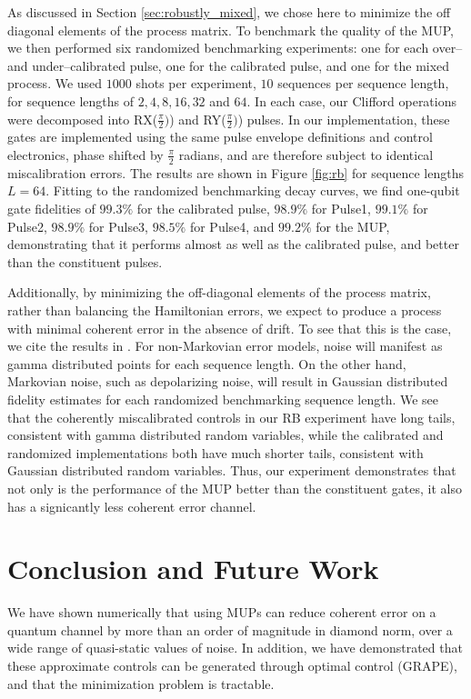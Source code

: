 \documentclass[aps,nofootinbib,pra,notitlepage,twocolumn]{revtex4-1}
\begin{document}
As discussed in Section \ref{sec:robustly_mixed}, we chose here to minimize the off diagonal elements of the process matrix. To benchmark the quality of the MUP, we then performed six randomized benchmarking experiments\cite{Magesan2011}: one for each over-- and under--calibrated pulse, one for the calibrated pulse, and one for the mixed process. We used $1000$ shots per experiment, $10$ sequences per sequence length, for sequence lengths of $2, 4, 8, 16, 32$ and $64$. In each case, our Clifford operations were decomposed into RX($\frac{\pi}{2})$) and RY($\frac{\pi}{2})$) pulses. In our implementation, these gates are implemented using the same pulse envelope definitions and control electronics, phase shifted by $\frac{\pi}{2}$ radians, and are therefore subject to identical miscalibration errors. The results are shown in Figure \ref{fig:rb} for sequence lengths $L=64$. Fitting to the randomized benchmarking decay curves, we find one-qubit gate fidelities of $99.3\%$ for the calibrated pulse, $98.9\%$ for Pulse1, $99.1\%$ for Pulse2, $98.9\%$ for Pulse3, $98.5\%$ for Pulse4, and $99.2\%$ for the MUP, demonstrating that it performs almost as well as the calibrated pulse, and better than the constituent pulses. 

Additionally, by minimizing the off-diagonal elements of the process matrix, rather than balancing the Hamiltonian errors, we expect to produce a process with minimal coherent error in the absence of drift. To see that this is the case, we cite the results in \cite{Ball2016}. For non-Markovian error models, noise will manifest as gamma distributed points for each sequence length. On the other hand, Markovian noise, such as depolarizing noise, will result in Gaussian distributed fidelity estimates for each randomized benchmarking sequence length. We see that the coherently miscalibrated controls in our RB experiment have long tails, consistent with gamma distributed random variables, while the calibrated and randomized implementations both have much shorter tails, consistent with Gaussian distributed random variables. Thus, our experiment demonstrates that not only is the performance of the MUP better than the constituent gates, it also has a signicantly less coherent error channel.




\section{Conclusion and Future Work}
We have shown numerically that using MUPs can reduce coherent error on a quantum channel by more than an order of magnitude in diamond norm, over a wide range of quasi-static values of noise. In addition, we have demonstrated that these approximate controls can be generated through optimal control (GRAPE), and that the minimization problem is tractable.
\end{document}

